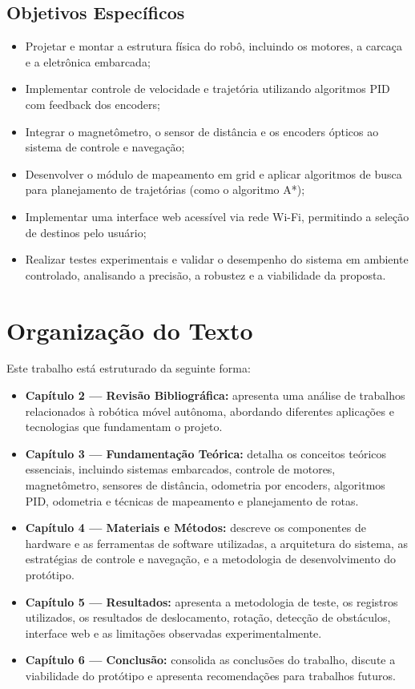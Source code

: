 \documentclass[	12pt, Times, openright, twoside, a4paper, english, brazil]{abntex2}
\begin{document}
\subsection{Objetivos Específicos}

\begin{itemize}
	\item Projetar e montar a estrutura física do robô, incluindo os motores, a carcaça e a eletrônica embarcada;
	\item Implementar controle de velocidade e trajetória utilizando algoritmos PID com feedback dos encoders;
	\item Integrar o magnetômetro, o sensor de distância e os encoders ópticos ao sistema de controle e navegação;
	\item Desenvolver o módulo de mapeamento em grid e aplicar algoritmos de busca para planejamento de trajetórias (como o algoritmo A*);
	\item Implementar uma interface web acessível via rede Wi-Fi, permitindo a seleção de destinos pelo usuário;
	\item Realizar testes experimentais e validar o desempenho do sistema em ambiente controlado, analisando a precisão, a robustez e a viabilidade da proposta.
\end{itemize}

\section{Organização do Texto}

Este trabalho está estruturado da seguinte forma:

\begin{itemize}
	\item \textbf{Capítulo 2 — Revisão Bibliográfica:} apresenta uma análise de trabalhos relacionados à robótica móvel autônoma, abordando diferentes aplicações e tecnologias que fundamentam o projeto.
	\item \textbf{Capítulo 3 — Fundamentação Teórica:} detalha os conceitos teóricos essenciais, incluindo sistemas embarcados, controle de motores, magnetômetro, sensores de distância, odometria por encoders, algoritmos PID, odometria e técnicas de mapeamento e planejamento de rotas.
	\item \textbf{Capítulo 4 — Materiais e Métodos:} descreve os componentes de hardware e as ferramentas de software utilizadas, a arquitetura do sistema, as estratégias de controle e navegação, e a metodologia de desenvolvimento do protótipo.
	\item \textbf{Capítulo 5 — Resultados:} apresenta a metodologia de teste, os registros utilizados, os resultados de deslocamento, rotação, detecção de obstáculos, interface web e as limitações observadas experimentalmente.
	\item \textbf{Capítulo 6 — Conclusão:} consolida as conclusões do trabalho, discute a viabilidade do protótipo e apresenta recomendações para trabalhos futuros.
\end{itemize}
\end{document}

